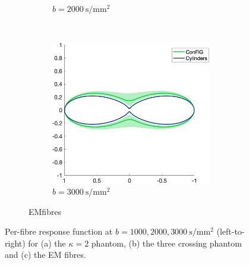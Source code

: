 \begin{figure}
\begin{subfigure}[]{\textwidth}
\begin{subfigure}[]{0.3\textwidth}
    \caption*{$b=\SI{2000}{\second\per\milli\metre\squared}$}
  \end{subfigure}
  ~
  \begin{subfigure}[]{0.3\textwidth}
    \includegraphics[width=\textwidth]{figures/frf_experiment/EMfibres_prctiles_b_3000}
    \caption*{$b=\SI{3000}{\second\per\milli\metre\squared}$}
  \end{subfigure}
  \caption{EMfibres}
  \end{subfigure}
  \caption[Per-fibre response function at $b = 1000,2000,\SI{3000}{\second\per\milli\metre\squared}$]{Per-fibre response function at $b = 1000,2000,\SI{3000}{\second\per\milli\metre\squared}$ (left-to-right) for (a) the $\kappa=2$ phantom, (b) the three crossing phantom and (c) the EM fibres.}
  \label{fig:frf_prctiles_b123}
\end{figure}

